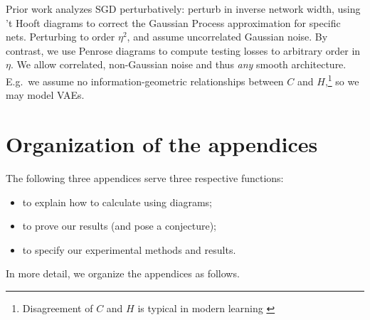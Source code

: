 \documentclass[anon,12pt]{colt2021} %
\begin{document}
        
            Prior work analyzes SGD perturbatively: \cite{dy19} perturb in
            inverse network width, using 't Hooft diagrams to correct the
            Gaussian Process approximation for specific nets.  Perturbing
            to order $\eta^2$, \cite{ch18} and \cite{li17} assume uncorrelated
            Gaussian noise.  By contrast, we use Penrose diagrams to compute
            testing losses to arbitrary order in $\eta$.  We allow correlated,
            non-Gaussian noise and thus \emph{any} smooth architecture.  E.g.\
            we assume no information-geometric relationships between $C$ and
            $H$,\footnote{
                Disagreement of $C$ and
                $H$ is typical in modern learning \citep{ro12, ku19}
            } so we may model VAEs. 

    \newpage
    
    
    
    \appendix

    \newpage
    \section*{Organization of the appendices}
        The following three appendices serve three respective functions:
        \setlist{nolistsep}
        \begin{itemize}[noitemsep]
            \item to explain how to calculate using diagrams;
            \item to prove our results (and pose a conjecture);
            \item to specify our experimental methods and results.
        \end{itemize}
        In more detail, we organize the appendices as follows.\\
    
\end{document}
